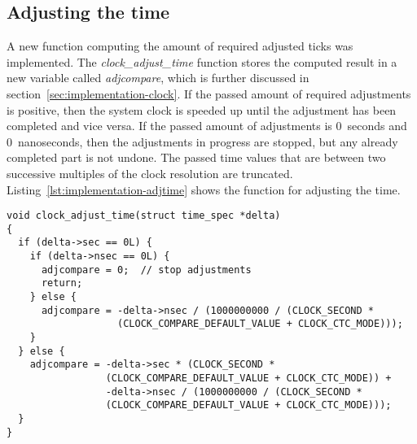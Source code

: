 \subsection{Adjusting the time}
A new function computing the amount of required adjusted ticks was implemented.
The {\it{clock\_adjust\_time}} function stores the computed result in
a new variable called {\it{adjcompare}}, which is further discussed in section~\ref{sec:implementation-clock}.
If the passed amount of required adjustments is positive, then the system clock is speeded up until
the adjustment has been completed and vice versa.
If the passed amount of adjustments is 0~seconds and 0~nanoseconds,
then the adjustments in progress are stopped, but any already completed part is not undone.
The passed time values that are between two successive multiples of the clock resolution are truncated.
Listing~\ref{lst:implementation-adjtime} shows the function for adjusting the time.
\begin{lstlisting}[caption={Function for adjusting the time},label={lst:implementation-adjtime}]
void clock_adjust_time(struct time_spec *delta)
{
  if (delta->sec == 0L) {
    if (delta->nsec == 0L) {
      adjcompare = 0;  // stop adjustments
      return;
    } else {
      adjcompare = -delta->nsec / (1000000000 / (CLOCK_SECOND *
                   (CLOCK_COMPARE_DEFAULT_VALUE + CLOCK_CTC_MODE)));
    }
  } else {
    adjcompare = -delta->sec * (CLOCK_SECOND *
                 (CLOCK_COMPARE_DEFAULT_VALUE + CLOCK_CTC_MODE)) +
                 -delta->nsec / (1000000000 / (CLOCK_SECOND *
                 (CLOCK_COMPARE_DEFAULT_VALUE + CLOCK_CTC_MODE)));
  }
}
\end{lstlisting}
